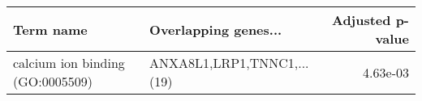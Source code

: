 \begin{tabular}{llr}
\toprule
                       Term name &       Overlapping genes... &  Adjusted p-value \\
\midrule
calcium ion binding (GO:0005509) & ANXA8L1,LRP1,TNNC1,...(19) &          4.63e-03 \\
\bottomrule
\end{tabular}
